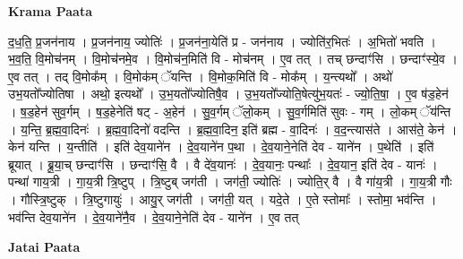 \documentclass[17pt]{extarticle}
\begin{document}
\textbf{Krama Paata} \newline

द॒ध॒ति॒ प्र॒जन॑नाय । प्र॒जन॑नाय॒ ज्योतिः॑ । प्र॒जन॑ना॒येति॑ प्र - जन॑नाय । ज्योति॑र॒भितः॑ । अ॒भितो॑ भवति । भ॒व॒ति॒ वि॒मोच॑नम् । वि॒मोच॑नमे॒व । वि॒मोच॑न॒मिति॑ वि - मोच॑नम् । ए॒व तत् । तच् छन्दाꣳ॑सि । छन्दाꣳ॑स्ये॒व । ए॒व तत् । तद् वि॒मोक᳚म् । वि॒मोक॑म् ॅयन्ति । वि॒मोक॒मिति॑ वि - मोक᳚म् । य॒न्त्यथो᳚ । अथो॑ उभ॒यतो᳚ज्योतिषा । अथो॒ इत्यथो᳚ । उ॒भ॒यतो᳚ज्योतिषै॒व । उ॒भ॒यतो᳚ज्योति॒षेत्यु॑भ॒यतः॑ - ज्यो॒ति॒षा॒ । ए॒व ष॑ड॒हेन॑ । ष॒ड॒हेन॑ सुव॒र्गम् । ष॒ड॒हेनेति॑ षट् - अ॒हेन॑ । सु॒व॒र्गम् ॅलो॒कम् । सु॒व॒र्गमिति॑ सुवः - गम् । लो॒कम् ॅय॑न्ति । य॒न्ति॒ ब्र॒ह्म॒वा॒दिनः॑ । ब्र॒ह्म॒वा॒दिनो॑ वदन्ति । ब्र॒ह्म॒वा॒दिन॒ इति॑ ब्रह्म - वा॒दिनः॑ । व॒द॒न्त्यास॑ते । आस॑ते॒ केन॑ । केन॑ यन्ति । य॒न्तीति॑ । इति॑ देव॒याने॑न । दे॒व॒याने॑न प॒था । दे॒व॒याने॒नेति॑ देव - याने॑न । प॒थेति॑ । इति॑ ब्रूयात् । ब्रू॒या॒च् छन्दाꣳ॑सि । छन्दाꣳ॑सि॒ वै । वै दे॑व॒यानः॑ । दे॒व॒यानः॒ पन्थाः᳚ । दे॒व॒यान॒ इति॑ देव - यानः॑ । पन्था॑ गाय॒त्री । गा॒य॒त्री त्रि॒ष्टुप् । त्रि॒ष्टुब् जग॑ती । जग॑ती॒ ज्योतिः॑ । ज्योति॒र् वै । वै गा॑य॒त्री । गा॒य॒त्री गौः । गौस्त्रि॒ष्टुक् । त्रि॒ष्टुगायुः॑ । आयु॒र् जग॑ती । जग॑ती॒ यत् । यदे॒ते । ए॒ते स्तोमाः᳚ । स्तोमा॒ भव॑न्ति । भव॑न्ति देव॒याने॑न । दे॒व॒याने॑नै॒व । दे॒व॒याने॒नेति॑ देव - याने॑न । ए॒व तत् \newline

\textbf{Jatai Paata} \newline
\end{document}
